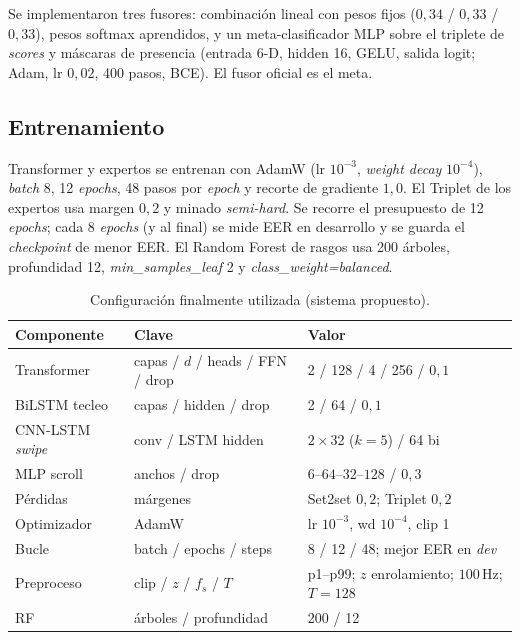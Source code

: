 Se implementaron tres fusores: combinación lineal con pesos fijos ($0{,}34$ / $0{,}33$ / $0{,}33$),
pesos softmax aprendidos, y un meta-clasificador MLP sobre el triplete de \textit{scores} y máscaras de presencia
(entrada $6$-D, hidden 16, GELU, salida logit; Adam, lr $0{,}02$, 400 pasos, BCE). El fusor oficial es el meta.

\subsection{Entrenamiento}

Transformer y expertos se entrenan con AdamW (lr $10^{-3}$, \textit{weight decay} $10^{-4}$), \textit{batch} 8,
12 \textit{epochs}, 48 pasos por \textit{epoch} y recorte de gradiente $1{,}0$. El Triplet de los expertos usa
margen $0{,}2$ y minado \textit{semi-hard}. Se recorre el presupuesto de 12 \textit{epochs}; cada 8 \textit{epochs}
(y al final) se mide EER en desarrollo y se guarda el \textit{checkpoint} de menor EER. El Random Forest de rasgos
usa 200 árboles, profundidad 12, \textit{min\_samples\_leaf} 2 y \textit{class\_weight=balanced}.

\begin{table}[h]
\centering
\caption{Configuración finalmente utilizada (sistema propuesto).}\label{tab:config_modelos}
\begin{tabular}{llp{6.2cm}}
\toprule
\textbf{Componente} & \textbf{Clave} & \textbf{Valor} \\
\midrule
Transformer & capas / $d$ / heads / FFN / drop & 2 / 128 / 4 / 256 / $0{,}1$ \\
BiLSTM tecleo & capas / hidden / drop & 2 / 64 / $0{,}1$ \\
CNN-LSTM \textit{swipe} & conv / LSTM hidden & $2\times$32 ($k{=}5$) / 64 bi \\
MLP scroll & anchos / drop & $6$--$64$--$32$--$128$ / $0{,}3$ \\
Pérdidas & márgenes & Set2set $0{,}2$; Triplet $0{,}2$ \\
Optimizador & AdamW & lr $10^{-3}$, wd $10^{-4}$, clip 1 \\
Bucle & batch / epochs / steps & 8 / 12 / 48; mejor EER en \textit{dev} \\
Preproceso & clip / $z$ / $f_s$ / $T$ & p1--p99; $z$ enrolamiento; $100$\,Hz; $T{=}128$ \\
RF & árboles / profundidad & 200 / 12 \\
\bottomrule
\end{tabular}
\end{table}

